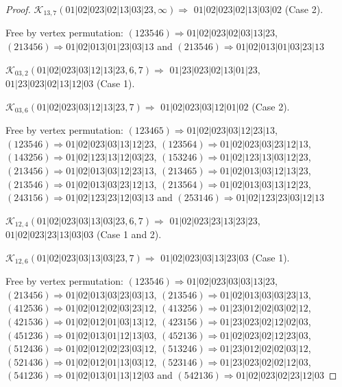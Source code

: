 \documentclass[12pt]{article}
\theoremstyle{plain}
\theoremstyle{definition}
\theoremstyle{remark}
\newcommand{\fancy}[1]{\mathcal{#1}}
\def\K{\fancy{K}}
\begin{document}
\begin{proof}
	$\K_{13,7}(01|02|023|02|13|03|23,\infty)\Rightarrow $ $01|02|023|02|13|03|02$ (Case 2).
	
	
	
	Free by vertex permutation: $(1 2 3 5 4 6)\Rightarrow 01|02|023|02|03|13|23$, $(2 1 3 4 5 6)\Rightarrow 01|02|013|01|23|03|13$ and $(2 1 3 5 4 6)\Rightarrow 01|02|013|01|03|23|13$
	
	
	
	\bigskip
	
	$\K_{03,2}(01|02|023|03|12|13|23,6, 7)\Rightarrow $ $01|23|023|02|13|01|23$, $01|23|023|02|13|12|03$ (Case 1).
	
	$\K_{03,6}(01|02|023|03|12|13|23,7)\Rightarrow $ $01|02|023|03|12|01|02$ (Case 2).
	
	
	
	Free by vertex permutation: $(1 2 3 4 6 5)\Rightarrow 01|02|023|03|12|23|13$, $(1 2 3 5 4 6)\Rightarrow 01|02|023|03|13|12|23$, $(1 2 3 5 6 4)\Rightarrow 01|02|023|03|23|12|13$, $(1 4 3 2 5 6)\Rightarrow 01|02|123|13|12|03|23$, $(1 5 3 2 4 6)\Rightarrow 01|02|123|13|03|12|23$, $(2 1 3 4 5 6)\Rightarrow 01|02|013|03|12|23|13$, $(2 1 3 4 6 5)\Rightarrow 01|02|013|03|12|13|23$, $(2 1 3 5 4 6)\Rightarrow 01|02|013|03|23|12|13$, $(2 1 3 5 6 4)\Rightarrow 01|02|013|03|13|12|23$, $(2 4 3 1 5 6)\Rightarrow 01|02|123|23|12|03|13$ and $(2 5 3 1 4 6)\Rightarrow 01|02|123|23|03|12|13$
	
	
	
	\bigskip
	
	$\K_{12,4}(01|02|023|03|13|03|23,6, 7)\Rightarrow $ $01|02|023|23|13|23|23$, $01|02|023|23|13|03|03$ (Case 1 and 2).
	
	$\K_{12,6}(01|02|023|03|13|03|23,7)\Rightarrow $ $01|02|023|03|13|23|03$ (Case 1).
	
	
	
	Free by vertex permutation: $(1 2 3 5 4 6)\Rightarrow 01|02|023|03|03|13|23$, $(2 1 3 4 5 6)\Rightarrow 01|02|013|03|23|03|13$, $(2 1 3 5 4 6)\Rightarrow 01|02|013|03|03|23|13$, $(4 1 2 5 3 6)\Rightarrow 01|02|012|02|03|23|12$, $(4 1 3 2 5 6)\Rightarrow 01|23|012|02|03|02|12$, $(4 2 1 5 3 6)\Rightarrow 01|02|012|01|03|13|12$, $(4 2 3 1 5 6)\Rightarrow 01|23|023|02|12|02|03$, $(4 5 1 2 3 6)\Rightarrow 01|02|013|01|12|13|03$, $(4 5 2 1 3 6)\Rightarrow 01|02|023|02|12|23|03$, $(5 1 2 4 3 6)\Rightarrow 01|02|012|02|23|03|12$, $(5 1 3 2 4 6)\Rightarrow 01|23|012|02|02|03|12$, $(5 2 1 4 3 6)\Rightarrow 01|02|012|01|13|03|12$, $(5 2 3 1 4 6)\Rightarrow 01|23|023|02|02|12|03$, $(5 4 1 2 3 6)\Rightarrow 01|02|013|01|13|12|03$ and $(5 4 2 1 3 6)\Rightarrow 01|02|023|02|23|12|03$
	

\end{proof}
\end{document}
